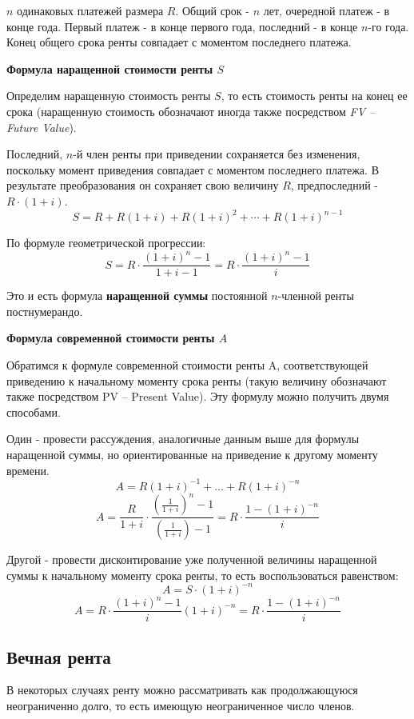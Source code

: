 \documentclass[aps,%
12pt,%
final,%
oneside,
onecolumn,%
musixtex, %
superscriptaddress,%
centertags]{article} %
\theoremstyle{plain}
\theoremstyle{definition}
\theoremstyle{remark}
\begin{document}
$n$ одинаковых платежей размера $R$. Общий срок - $n$ лет, очередной платеж - в конце года. Первый платеж - в конце первого года, последний - в конце $n$-го года. Конец общего срока ренты совпадает с моментом последнего платежа.

\textbf{Формула наращенной стоимости ренты $S$} 

Определим наращенную стоимость ренты $S$, то есть стоимость ренты на конец ее срока (наращенную стоимость обозначают иногда также посредством \textit{FV – Future Value}).

Последний, $n$-й член ренты при приведении сохраняется без изменения, поскольку момент приведения совпадает с моментом последнего платежа. В результате преобразования он сохраняет свою величину $R$, предпоследний - $R \cdot (1+i)$.
$$ S = R + R(1+i) + R(1+i)^2 + \cdots + R(1+i)^{n-1}$$

По формуле геометрической прогрессии:
$$ S = R \cdot \frac{(1+i)^n - 1 }{1+i-1} = R \cdot \frac{(1+i)^n - 1 }{i} $$

Это и есть формула \textbf{наращенной суммы} постоянной $n$-членной ренты постнумерандо. 

\textbf{Формула современной стоимости ренты $A$}

Обратимся к формуле современной стоимости ренты A, соответствующей приведению к начальному моменту срока ренты (такую величину обозначают также посредством PV – Present Value). Эту формулу можно получить двумя способами.

Один - провести рассуждения, аналогичные данным выше для формулы наращенной суммы, но ориентированные на приведение к другому моменту времени. 
$$ A = R (1+i)^{-1} + \ldots + R (1+i)^{-n}$$ 
$$ A = \frac{R}{1+i} \cdot \frac{\left(\frac{1}{1+i}\right)^n - 1}{\left(\frac{1}{1+i}\right)-1} = R \cdot \frac {1-(1+i)^{-n}}{i}$$

Другой - провести дисконтирование уже полученной величины наращенной суммы к начальному моменту срока ренты, то есть воспользоваться равенством:
$$ A  = S\cdot (1+i)^{-n}$$
$$ A = R \cdot \frac{(1+i)^n - 1 }{i} (1+i)^{-n} = R \cdot \frac {1-(1+i)^{-n}}{i}$$


\subsection{Вечная рента}

В некоторых случаях ренту можно рассматривать как продолжающуюся неограниченно долго, то есть имеющую неограниченное число членов. 
\end{document}
